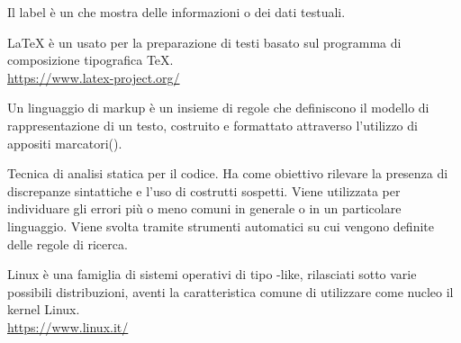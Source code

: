 Il label è un  che mostra delle informazioni o dei dati testuali.

\LaTeX{} è un  usato per la preparazione di testi basato sul programma di composizione tipografica \TeX.\\
\url{https://www.latex-project.org/}

Un linguaggio di markup è un insieme di regole che definiscono il modello di rappresentazione di un testo, costruito e formattato attraverso l’utilizzo di appositi marcatori().

Tecnica di analisi statica per il codice. Ha come obiettivo rilevare la presenza di discrepanze sintattiche e l’uso di costrutti sospetti. Viene utilizzata per individuare gli errori più o meno comuni in generale o in un particolare linguaggio. Viene svolta tramite strumenti automatici su cui vengono definite delle regole di ricerca.

Linux è una famiglia di sistemi operativi di tipo -like, rilasciati sotto varie possibili distribuzioni, aventi la caratteristica comune di utilizzare come nucleo il kernel Linux.\\
\url{https://www.linux.it/}
\clearpage
